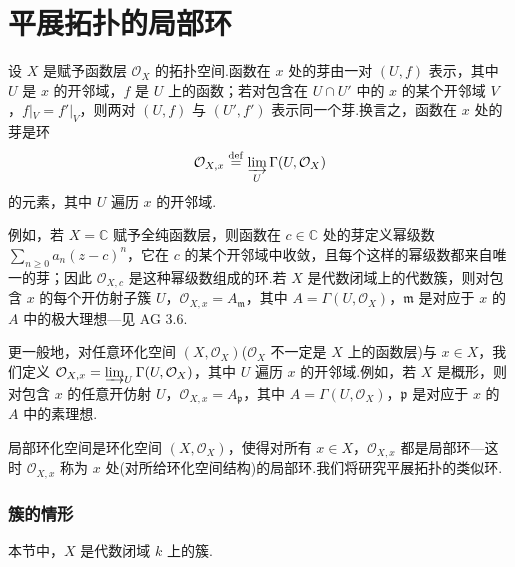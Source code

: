 ﻿%
\chapter{平展拓扑的局部环}\label{sec:4}

设 $X$ 是赋予函数层 $\mathcal{O}_X$ 的拓扑空间.函数在 $x$ 处的芽由一对 $(U, f)$ 表示，其中 $U$ 是 $x$ 的开邻域，$f$ 是 $U$ 上的函数；若对包含在 $U \cap U'$ 中的 $x$ 的某个开邻域 $V$，$f|_{V} = f'|_{V}$，则两对 $(U, f)$ 与 $(U', f')$ 表示同一个芽.换言之，函数在 $x$ 处的芽是环
\[
\mathcal{O}_{X, x} \overset{\mathrm{def}}{=} \varinjlim_{U} \Gamma(U, \mathcal{O}_X)
\]
的元素，其中 $U$ 遍历 $x$ 的开邻域.

例如，若 $X = \mathbb{C}$ 赋予全纯函数层，则函数在 $c \in \mathbb{C}$ 处的芽定义幂级数 $\sum_{n \geq 0} a_n (z - c)^{n}$，它在 $c$ 的某个开邻域中收敛，且每个这样的幂级数都来自唯一的芽；因此 $\mathcal{O}_{X, c}$ 是这种幂级数组成的环.若 $X$ 是代数闭域上的代数簇，则对包含 $x$ 的每个开仿射子簇 $U$，$\mathcal{O}_{X, x} = A_{\mathfrak{m}}$，其中 $A = \Gamma(U, \mathcal{O}_X)$，$\mathfrak{m}$ 是对应于 $x$ 的 $A$ 中的极大理想---见 AG 3.6.

更一般地，对任意环化空间 $(X, \mathcal{O}_X)$($\mathcal{O}_X$ 不一定是 $X$ 上的函数层)与 $x \in X$，我们定义 $\mathcal{O}_{X, x} = \varinjlim_{U} \Gamma(U, \mathcal{O}_X)$，其中 $U$ 遍历 $x$ 的开邻域.例如，若 $X$ 是概形，则对包含 $x$ 的任意开仿射 $U$，$\mathcal{O}_{X, x} = A_{\mathfrak{p}}$，其中 $A = \Gamma(U, \mathcal{O}_X)$，$\mathfrak{p}$ 是对应于 $x$ 的 $A$ 中的素理想.

局部环化空间是环化空间 $(X, \mathcal{O}_X)$，使得对所有 $x \in X$，$\mathcal{O}_{X, x}$ 都是局部环---这时 $\mathcal{O}_{X, x}$ 称为 $x$ 处(对所给环化空间结构)的局部环.我们将研究平展拓扑的类似环.

\subsection*{簇的情形}

本节中，$X$ 是代数闭域 $k$ 上的簇.


